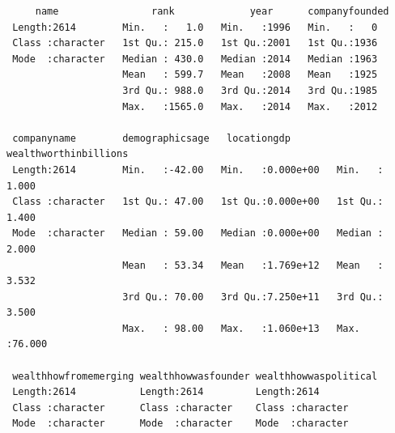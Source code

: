 \documentclass[
]{book}
\begin{document}
\begin{verbatim}
     name                rank             year      companyfounded
 Length:2614        Min.   :   1.0   Min.   :1996   Min.   :   0  
 Class :character   1st Qu.: 215.0   1st Qu.:2001   1st Qu.:1936  
 Mode  :character   Median : 430.0   Median :2014   Median :1963  
                    Mean   : 599.7   Mean   :2008   Mean   :1925  
                    3rd Qu.: 988.0   3rd Qu.:2014   3rd Qu.:1985  
                    Max.   :1565.0   Max.   :2014   Max.   :2012  
                                                                  
 companyname        demographicsage   locationgdp        wealthworthinbillions
 Length:2614        Min.   :-42.00   Min.   :0.000e+00   Min.   : 1.000       
 Class :character   1st Qu.: 47.00   1st Qu.:0.000e+00   1st Qu.: 1.400       
 Mode  :character   Median : 59.00   Median :0.000e+00   Median : 2.000       
                    Mean   : 53.34   Mean   :1.769e+12   Mean   : 3.532       
                    3rd Qu.: 70.00   3rd Qu.:7.250e+11   3rd Qu.: 3.500       
                    Max.   : 98.00   Max.   :1.060e+13   Max.   :76.000       
                                                                              
 wealthhowfromemerging wealthhowwasfounder wealthhowwaspolitical
 Length:2614           Length:2614         Length:2614          
 Class :character      Class :character    Class :character     
 Mode  :character      Mode  :character    Mode  :character     
                                                                
                                                                
                                                                

\end{verbatim}
\end{document}
